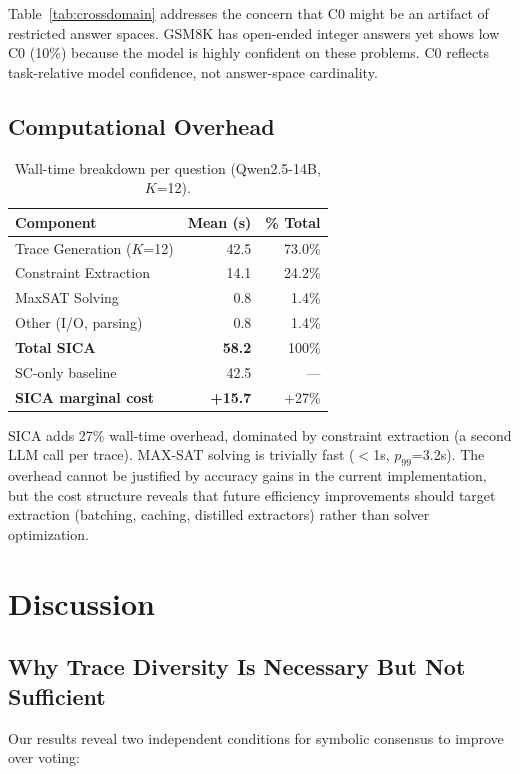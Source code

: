 \documentclass[11pt,a4paper]{article}
\begin{document}
Table~\ref{tab:crossdomain} addresses the concern that C0 might be an artifact of restricted answer spaces. GSM8K has open-ended integer answers yet shows low C0 (10\%) because the model is highly confident on these problems. C0 reflects task-relative model confidence, not answer-space cardinality.

\subsection{Computational Overhead}

\begin{table}[t]
\centering
\small
\caption{Wall-time breakdown per question (Qwen2.5-14B, $K$=12).}
\label{tab:overhead}
\begin{tabular}{lrr}
\toprule
\textbf{Component} & \textbf{Mean (s)} & \textbf{\% Total} \\
\midrule
Trace Generation ($K$=12) & 42.5 & 73.0\% \\
Constraint Extraction & 14.1 & 24.2\% \\
MaxSAT Solving & 0.8 & 1.4\% \\
Other (I/O, parsing) & 0.8 & 1.4\% \\
\midrule
\textbf{Total SICA} & \textbf{58.2} & 100\% \\
SC-only baseline & 42.5 & --- \\
\textbf{SICA marginal cost} & \textbf{+15.7} & +27\% \\
\bottomrule
\end{tabular}
\end{table}

SICA adds 27\% wall-time overhead, dominated by constraint extraction (a second LLM call per trace). MAX-SAT solving is trivially fast ($<$1s, $p_{99}$=3.2s). The overhead cannot be justified by accuracy gains in the current implementation, but the cost structure reveals that future efficiency improvements should target extraction (batching, caching, distilled extractors) rather than solver optimization.

\section{Discussion}

\subsection{Why Trace Diversity Is Necessary But Not Sufficient}

Our results reveal two independent conditions for symbolic consensus to improve over voting:
\end{document}
